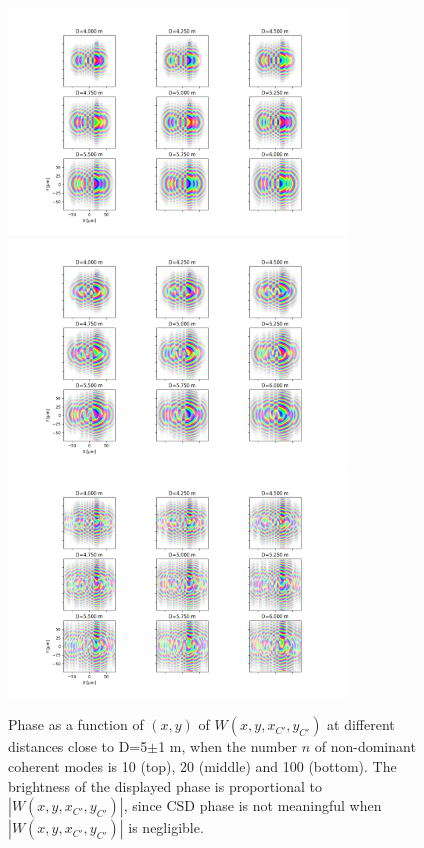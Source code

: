 \documentclass{iucr}              %
\begin{document}
\begin{figure}
\caption{Phase as a function of $(x,y)$ of $W(x,y,x_{C'},y_{C'})$ at different distances close to D=5$\pm$1 m, when the number $n$ of non-dominant coherent modes is 10 (top), 20 (middle) and 100 (bottom). The brightness of the displayed phase is proportional to $|W(x,y,x_{C'},y_{C'})|$, since CSD phase is not meaningful when $|W(x,y,x_{C'},y_{C'})|$ is negligible.}
\includegraphics[width=9cm]{Figures/vx_id16a_C5_propagated_neighbour_mode0009.png}
\includegraphics[width=9cm]{Figures/vx_id16a_C5_propagated_neighbour_mode0019.png}
\includegraphics[width=9cm]{Figures/vx_id16a_C5_propagated_neighbour_mode0099.png}
\label{neighbour}
\end{figure}
\end{document}
